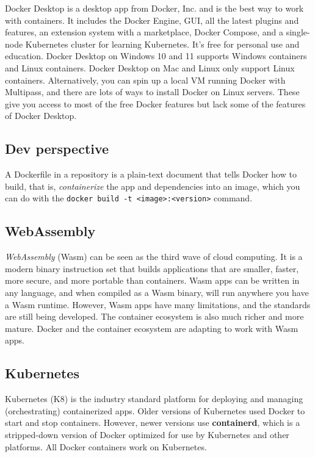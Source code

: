 \documentclass[8pt, table, xcdraw]{article}%
\begin{document}
Docker Desktop is a desktop app from Docker, Inc. and is the best way to work with containers. It includes the Docker Engine, GUI, all the latest plugins and features, an extension system with a marketplace, Docker Compose, and a single-node Kubernetes cluster for learning Kubernetes. It’s free for personal use and education. Docker Desktop on Windows 10 and 11 supports Windows containers and Linux containers. Docker Desktop on Mac and Linux only support Linux containers. Alternatively, you can spin up a local VM running Docker with Multipass, and there are lots of ways to install Docker on Linux servers. These give you access to most of the free Docker features but lack some of the features of Docker Desktop.

\subsection{Dev perspective}

A Dockerfile in a repository is a plain-text document that tells Docker how to build, that is, \emph{containerize} the app and dependencies into an image, which you can do with the \lstinline{docker build -t <image>:<version>} command.

\subsection{WebAssembly}

\emph{WebAssembly} (Wasm) can be seen as the third wave of cloud computing. It is a modern binary instruction set that builds applications that are smaller, faster, more secure, and more portable than containers. Wasm apps can be written in any language, and when compiled as a Wasm binary, will run anywhere you have a Wasm runtime. However, Wasm apps have many limitations, and the standards are still being developed. The container ecosystem is also much richer and more mature. Docker and the container ecosystem are adapting to work with Wasm apps.

\subsection{Kubernetes}

Kubernetes (K8) is the industry standard platform for deploying and managing (orchestrating) containerized apps. Older versions of Kubernetes used Docker to start and stop containers. However, newer versions use \textbf{containerd}, which is a stripped-down version of Docker optimized for use by Kubernetes and other platforms. All Docker containers work on Kubernetes.
\end{document}
